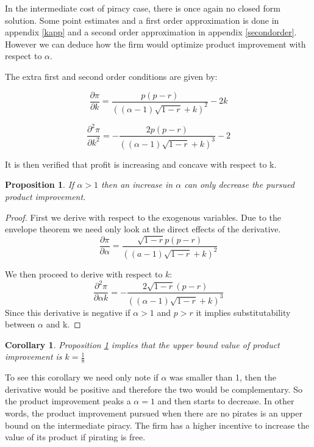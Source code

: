 \documentclass[11pt]{article}
\newtheorem{corollary}{Corollary}
\newtheorem{proposition}{Proposition}
\begin{document}
In the intermediate cost of piracy case, there is once again no closed form solution. Some point estimates and  a first order approximation is done in  appendix \ref{kapp} and a second order approximation in appendix \ref{secondorder}. However we can deduce how the firm would optimize product improvement with respect to $\alpha$. 

The extra first and second order conditions are given by:

\begin{equation*}
\frac{\partial \pi}{\partial k} = \frac{ p(p-r)}{((\alpha-1)
\sqrt{ 1-r }
+k)^2} -2k
\end{equation*}

\begin{equation*}
\frac{\partial^2 \pi}{\partial k^2} = -\frac{2 p(p-r)}{((\alpha-1)
\sqrt{ 1-r }
+k)^3} -2
\end{equation*}

It is then verified that profit is increasing and concave with respect to k. 

\begin{proposition}
\label{alphak}
If $\alpha>1$ then an increase in $\alpha$ can only decrease the pursued product improvement. 
\end{proposition}

\begin{proof}
First we derive with respect to the exogenous variables. Due to the envelope theorem we need only look at the direct effects of the derivative. 
\begin{equation*}
\frac{\partial \pi }{\partial \alpha} =\frac{\sqrt{1-r}p (p-r)}{\left((a-1) \sqrt{1-r}+k\right)^2}
\end{equation*}

We then proceed to derive with respect to $k$:
\begin{equation*}
\frac{\partial^2 \pi }{\partial \alpha k} =
-\frac{2 \sqrt{1-r} (p-r)}{\left((\alpha-1) \sqrt{1-r}+k\right)^3}
\end{equation*}
Since this derivative is negative if $\alpha>1$ and $p>r$ it implies substitutability between $\alpha$ and k.  
\end{proof}

\begin{corollary}
Proposition \ref{alphak} implies that the upper bound value of product improvement is $k= \frac{1}{8}$
\end{corollary}

To see this corollary we need only note if $\alpha$ was smaller than 1, then the derivative would be positive and therefore the two would be complementary. So the product improvement peaks a $\alpha=1$ and then starts to decrease. In other words, the product improvement pursued when there are no pirates is an upper bound on the intermediate piracy. The firm has a higher incentive to increase the value of its product if pirating is free. 
\end{document}
